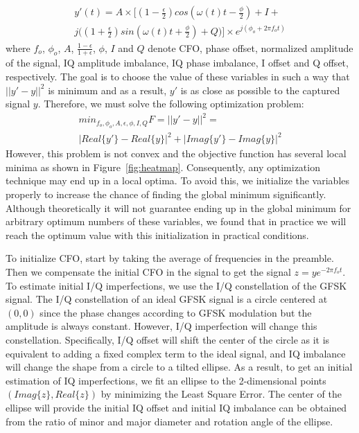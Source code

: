 \begin{gather*}
    y'(t) = A \times \big[(1-\frac{\epsilon}{2})cos(\omega(t)t-\frac{\phi}{2})+I+ \\
    j\big((1+\frac{\epsilon}{2})sin(\omega(t)t+\frac{\phi}{2})+Q\big)\big] \times e^{j(\phi_o+2\pi f_o t)}
\end{gather*}
where $f_o$, $\phi_o$, $A$, $\frac{1-\epsilon}{1+\epsilon}$, $\phi$, $I$ and $Q$ denote CFO, phase offset, normalized amplitude of the signal, IQ amplitude imbalance, IQ phase imbalance, I offset and Q offset, respectively. The goal is to choose the value of these variables in such a way that $||y'-y||^2$ is minimum and as a result, $y'$ is as close as possible to the captured signal $y$. Therefore, we must solve the following optimization problem:
\begin{gather*}
    min_{f_o,\phi_o,A,\epsilon,\phi,I,Q}{F=||y'-y||^2 =} \\ |Real\{y'\}-Real\{y\}|^2+|Imag\{y'\}-Imag\{y\}|^2
\end{gather*}
However, this problem is not convex and the objective function has several local minima as shown in Figure~\ref{fig:heatmap}. Consequently, any optimization technique may end up in a local optima. To avoid this, we initialize the variables properly to increase the chance of finding the global minimum significantly. Although theoretically it will not guarantee ending up in the global minimum for arbitrary optimum numbers of these variables, we found that in practice we will reach the optimum value with this initialization in practical conditions. 

To initialize CFO, start by taking the average of frequencies in the preamble. Then we compensate the initial CFO in the signal to get the signal $z = y e^{-2\pi f_o t}$. To estimate initial I/Q imperfections, we use the I/Q constellation of the GFSK signal. The I/Q constellation of an ideal GFSK signal is a circle centered at $(0,0)$ since the phase changes according to GFSK modulation but the amplitude is always constant. However, I/Q imperfection will change this constellation. Specifically, I/Q offset will shift the center of the circle as it is equivalent to adding a fixed complex term to the ideal signal, and IQ imbalance will change the shape from a circle to a tilted ellipse.
%
As a result, to get an initial estimation of IQ imperfections, we fit an ellipse to the 2-dimensional points $(Imag\{z\},Real\{z\})$ by minimizing the Least Square Error. The center of the ellipse will provide the initial IQ offset and initial IQ imbalance can be obtained from the ratio of minor and major diameter and rotation angle of the ellipse.\\

